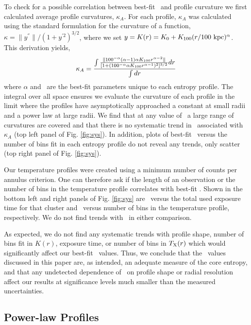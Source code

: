 \documentclass[12pt,preprint]{aastex}
\begin{document}
To check for a possible correlation between best-fit \kna\ and profile
curvature we first calculated average profile curvatures,
$\kappa_A$. For each profile, $\kappa_A$ was calculated using the
standard formulation for the curvature of a function, $\kappa =
\|y^{''}\|/(1+y^{'2})^{3/2}$, where we set $y = K(r) =
K_0+K_{100}(r/100\mbox{\ensuremath{\mathrm{~kpc}}})^{\alpha}$. This derivation yields,
\begin{equation}
\kappa_A = \frac{\int\frac{\| 100^{-\alpha} (\alpha-1) \alpha K_{100}
  r^{\alpha-2}\|}{[1+(100^{-\alpha} \alpha K_{100}
    r^{\alpha-1})^2]^{3/2}} dr}{\int dr}
\label{eqn:avgcurv}
\end{equation}
where $\alpha$ and \khun\ are the best-fit parameters unique to each
entropy profile. The integral over all space ensures we evaluate the
curvature of each profile in the limit where the profiles have
asymptotically approached a constant at small radii and a power law at
large radii. We find that at any value of \kna\ a large range of
curvatures are covered and that there is no systematic trend in
\kna\ associated with $\kappa_A$ (top left panel of
Fig. \ref{fig:sys}). In addition, plots of best-fit \kna\ versus the
number of bins fit in each entropy profile do not reveal any trends,
only scatter (top right panel of Fig. \ref{fig:sys}).

Our temperature profiles were created using a minimum number of counts
per annulus criterion. One can therefore ask if the length of an
observation or the number of bins in the temperature profile
correlates with best-fit \kna. Shown in the bottom left and right
panels of Fig. \ref{fig:sys} are \kna\ versus the total used exposure
time for that cluster and \kna\ versus number of bins in the
temperature profile, respectively. We do not find trends with \kna\ in
either comparison.

As expected, we do not find any systematic trends with profile shape,
number of bins fit in $K(r)$, exposure time, or number of bins in
$T_{\mathrm{X}}(r)$ which would significantly affect our best-fit
\kna\ values. Thus, we conclude that the \kna\ values discussed in
this paper are, as intended, an adequate measure of the core entropy,
and that any undetected dependence of \kna\ on profile shape or radial
resolution affect our results at significance levels much smaller than
the measured uncertainties.

\subsection{Power-law Profiles}
\label{sec:quality}
\end{document}

